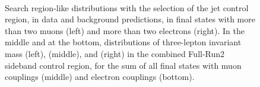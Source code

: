 \begin{figure}[h]
\noindent
  \\
  \caption{Search region-like distributions with the selection of the
    \PQb jet control region, in data and background
    predictions, in final states with more than two muons (left) and
    more than two electrons (right). In the middle and at the bottom, distributions of three-lepton invariant mass (left), \mtwol
    (middle), and \Deltwod (right) in the combined Full-Run2 sideband control region,
    for the sum of all final states with muon couplings (middle) and
    electron couplings (bottom).}
  \label{fig:sb_ttbar_Ctrl}
\end{figure}


